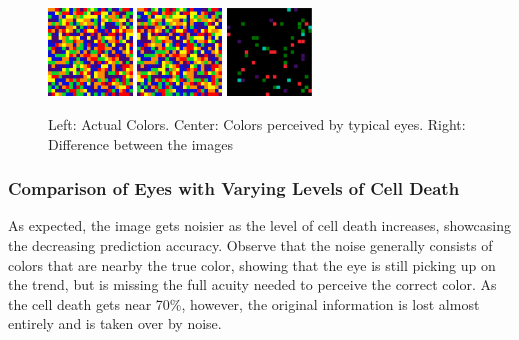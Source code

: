 \documentclass[titlepage]{article}
\begin{document}
\begin{figure}[H]
    \centering
    \includegraphics[width=0.2\textwidth]{figs/typical_actual_results.png}
    \includegraphics[width=0.2\textwidth]{figs/typical_predicted_results.png}
    \includegraphics[width=0.2\textwidth]{figs/typical_diff.png}
    \caption{Left: Actual Colors. Center: Colors perceived by typical eyes. Right: Difference between the images}
\end{figure}

\subsubsection{Comparison of Eyes with Varying Levels of Cell Death}

As expected, the image gets noisier as the level of cell death increases, showcasing the decreasing prediction accuracy. Observe that the noise generally consists of colors that are nearby the true color, showing that the eye is still picking up on the trend, but is missing the full acuity needed to perceive the correct color. As the cell death gets near 70\%, however, the original information is lost almost entirely and is taken over by noise.
\end{document}
